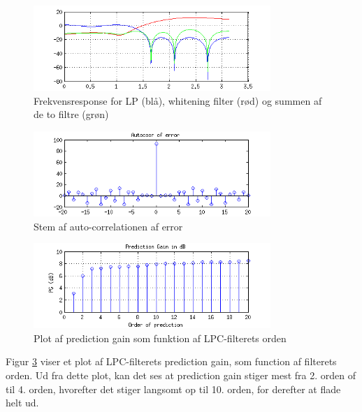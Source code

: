 \begin{figure}[!ht]
	\centering
	\includegraphics[width=0.8\textwidth]{resources/part3_lp_and_whitening_filter}
 	\caption{Frekvensresponse for LP (blå), whitening filter (rød) og summen af de to filtre (grøn)}
 	\label{fig:part3_5}
\end{figure}

\begin{figure}[!ht]
	\centering
	\includegraphics[width=0.8\textwidth]{resources/part3_error_xcorr}
 	\caption{Stem af auto-correlationen af error}
 	\label{fig:part3_6}
\end{figure}

\begin{figure}[!ht]
	\centering
	\includegraphics[width=0.8\textwidth]{resources/part3_pg_as_function_of_order}
 	\caption{Plot af prediction gain som funktion af LPC-filterets orden}
 	\label{fig:part3_7}
\end{figure}

Figur \ref{fig:part3_7} viser et plot af LPC-filterets prediction gain, som function af filterets orden. Ud fra dette plot, kan det ses at prediction gain stiger mest fra 2. orden of til 4. orden, hvorefter det stiger langsomt op til 10. orden, for derefter at flade helt ud.


